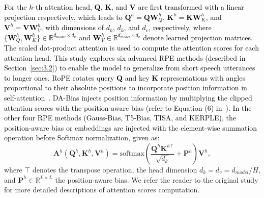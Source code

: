 \documentclass[journal]{IEEEtran}
\begin{document}
\textcolor{black}{For the $h$-th attention head, $\textbf{Q}$, $\textbf{K}$, and $\textbf{V}$ are first transformed with a linear projection respectively, which leads to $\textbf{Q}^{h}\!=\!\textbf{Q}\textbf{W}_{Q}^{h}$, $\textbf{K}^{h}\!=\!\textbf{K}\textbf{W}_{K}^{h}$, and $\textbf{V}^{h}\!=\!\textbf{V}\textbf{W}_{V}^{h}$, with dimensions of $d_{k}$, $d_{k}$, and $d_{v}$, respectively, where $\{\textbf{W}^{h}_{Q}, \textbf{W}_{K}^{h}\}\!\in\!\mathbb{R}^{d_{model}\times d_{k}}$ and $\textbf{W}_{V}^{h}\in\!\mathbb{R}^{d_{model}\times d_{v}}$ denote learned projection matrices. The scaled dot-product attention is used to compute the attention scores for each attention head. \textcolor{black}{This study explores \textcolor{black}{six} advanced RPE methods (described in Section~\ref{sec:3.2}) to enable the model to generalize from short speech utterances to longer ones. RoPE rotates query $\textbf{Q}$ and key $\textbf{K}$ representations with angles proportional to their absolute positions to incorporate position information in self-attention~\cite{RoPE}. DA-Bias injects position information by multiplying the clipped attention scores with the position-aware bias (refer to Equation (6) in~\cite{DA}).} In the other four RPE methods (Gauss-Bias, T5-Bias, TISA, and KERPLE), the position-aware bias or embeddings are injected with the element-wise summation operation before Softmax normalization, given as:}
\begin{equation}
    \textbf{A}^{h} \left(\textbf{Q}^{h}, \textbf{K}^{h}, \textbf{V}^{h}\right) = \text{softmax}\left(\frac{\textbf{Q}^{h}\textbf{K}^{h\top}}{\sqrt{d_{k}}}+\textbf{P}^{h}\right)\textbf{V}^{h},
\end{equation}
where $\top$ denotes the transpose operation, the head dimension $d_{k}\!=\!d_{v}\!=\!d_{model}/{H}$, and $\textbf{P}^{h}\!\in\!\mathbb{R}^{L\times L}$ the position-aware bias. We refer the reader to the original study \cite{attention2017} for more detailed descriptions of attention scores computation.

\end{document}

